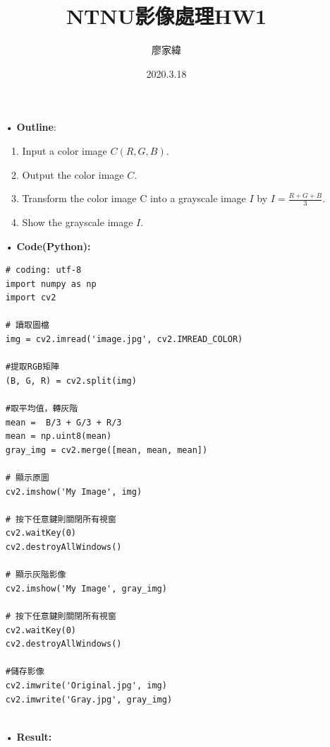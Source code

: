 \documentclass[12pt,a4paper]{article}
\title{NTNU影像處理HW1}
\author{廖家緯}
\date{2020.3.18}
\begin{document}
\maketitle
\fontsize{12pt}{20pt}\selectfont
\setlength{\baselineskip}{20pt}

\pagestyle{fancy}
\lhead{}
\chead{}
\rhead{}
\lfoot{}
\cfoot{\thepage}
\rfoot{}
\renewcommand{\headrulewidth}{0pt} %
\renewcommand{\footrulewidth}{0pt} %




\begin{enumerate}

\item[•]
{\bf Outline}:
\begin{enumerate}
\item
Input a color image $C(R,G,B)$.
\item
Output the color image $C$.
\item
Transform the color image C into a 
grayscale image $I$ by
$I = \displaystyle \frac{R+G+B}{3}$.
\item
Show the grayscale image $I$.\\
\end{enumerate}

\item[•]
{\bf Code(Python):}
\begin{lstlisting}
# coding: utf-8
import numpy as np
import cv2

# 讀取圖檔
img = cv2.imread('image.jpg', cv2.IMREAD_COLOR)

#提取RGB矩陣
(B, G, R) = cv2.split(img)

#取平均值，轉灰階
mean =  B/3 + G/3 + R/3
mean = np.uint8(mean)
gray_img = cv2.merge([mean, mean, mean])

# 顯示原圖
cv2.imshow('My Image', img)

# 按下任意鍵則關閉所有視窗
cv2.waitKey(0)
cv2.destroyAllWindows()

# 顯示灰階影像
cv2.imshow('My Image', gray_img)

# 按下任意鍵則關閉所有視窗
cv2.waitKey(0)
cv2.destroyAllWindows()

#儲存影像
cv2.imwrite('Original.jpg', img)
cv2.imwrite('Gray.jpg', gray_img)


\end{lstlisting}

\item[•]
{\bf Result:}


\end{enumerate}
\end{document}
